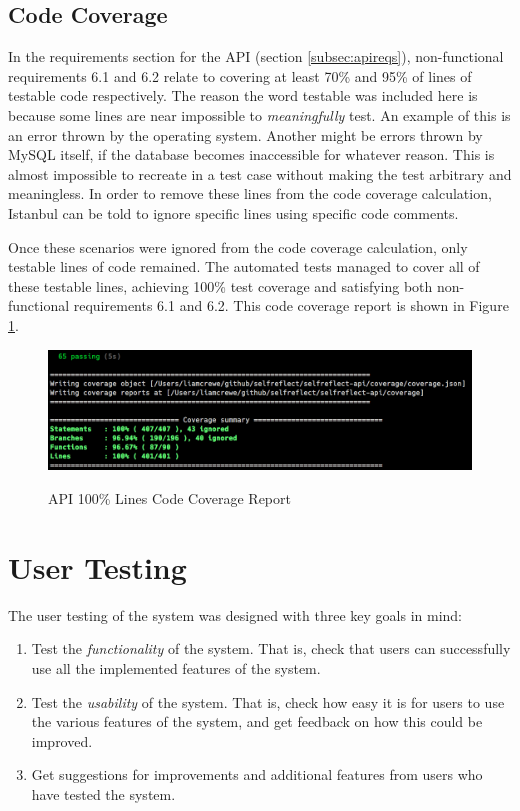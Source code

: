 \documentclass[11pt,openright,a4paper]{report}
\begin{document}
\subsection{Code Coverage}
In the requirements section for the API (section \ref{subsec:apireqs}), non-functional requirements 6.1 and 6.2 relate to covering at least 70\% and 95\% of lines of testable code respectively. The reason the word testable was included here is because some lines are near impossible to \emph{meaningfully} test. An example of this is an error thrown by the operating system. Another might be errors thrown by MySQL itself, if the database becomes inaccessible for whatever reason. This is almost impossible to recreate in a test case without making the test arbitrary and meaningless. In order to remove these lines from the code coverage calculation, Istanbul can be told to ignore specific lines using specific code comments.

Once these scenarios were ignored from the code coverage calculation, only testable lines of code remained. The automated tests managed to cover all of these testable lines, achieving 100\% test coverage and satisfying both non-functional requirements 6.1 and 6.2. This code coverage report is shown in Figure \ref{fig:codecoverage}.

\begin{figure}[ht]
\centering
\caption{API 100\% Lines Code Coverage Report}
\includegraphics[width=\textwidth]{i/codecoverage.png}
\label{fig:codecoverage}
\end{figure}

\newpage
\section{User Testing} \label{sec:usertesting}
The user testing of the system was designed with three key goals in mind:
\begin{enumerate}
\item Test the \emph{functionality} of the system. That is, check that users can successfully use all the implemented features of the system.
\item Test the \emph{usability} of the system. That is, check how easy it is for users to use the various features of the system, and get feedback on how this could be improved.
\item Get suggestions for improvements and additional features from users who have tested the system.
\end{enumerate}
\end{document}
